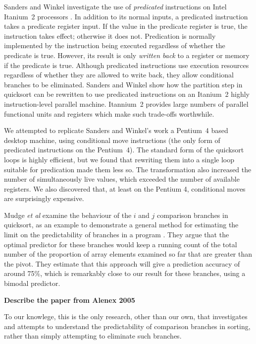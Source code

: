 \documentclass[acmtocl]{acmtrans2m}
\begin{document}
Sanders and Winkel investigate the use of \emph{predicated}
instructions on Intel Itanium~2 processors \cite{SandersWinkel05}. In
addition to its normal inputs, a predicated instruction takes a
predicate register input. If the value in the predicate register is
true, the instruction takes effect; otherwise it does not. Predication
is normally implemented by the instruction being executed regardless
of whether the predicate is true. However, its result is only
\textit{written back} to a register or memory if the predicate is
true. Although predicated instructions use execution resources
regardless of whether they are allowed to write back, they allow
conditional branches to be eliminated.  Sanders and Winkel show how
the partition step in quicksort can be rewritten to use predicated
instructions on an Itanium~2 highly instruction-level parallel
machine. Itannium~2 provides large numbers of parallel functional
units and registers which make such trade-offs worthwhile.

We attempted to replicate Sanders and Winkel's work a Pentium~4 based
desktop machine, using conditional move instructions (the only form of
predicated instructions on the Pentium~4). The standard form of the
quicksort loops is highly efficient, but we found that rewriting them
into a single loop suitable for predication made them less so. The
transformation also increased the number of simultaneously live
values, which exceeded the number of available registers. We also
discovered that, at least on the Pentium 4, conditional moves are
surprisingly expensive.

Mudge \textit{et al} examine the behaviour of the $i$ and $j$
comparison branches in quicksort, as an example to demonstrate a
general method for estimating the limit on the predictability of
branches in a program \cite{Mudge+96}. They argue that the optimal
predictor for these branches would keep a running count of the total
number of the proportion of array elements examined so far that are
greater than the pivot. They estimate that this approach will give a
prediction accuracy of around 75\%, which is remarkably close to our
result for these branches, using a bimodal predictor.

\textbf{Describe the paper from Alenex 2005}

To our knowlege, this is the only research, other than our own, that
investigates and attempts to understand the predictability of
comparison branches in sorting, rather than simply attempting to
eliminate such branches.
\end{document}
